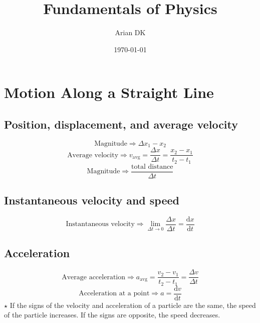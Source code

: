\documentclass[fleqn]{article}
\title{Fundamentals of Physics}
\author{Arian DK}
\date{\today}
\begin{document}
\setcounter{section}{1}

\maketitle

\section{Motion Along a Straight Line}

\subsection{Position, displacement, and average velocity}

\begin{equation*}
    \textrm{Magnitude} \Rightarrow \Delta x_1 - x_2
\end{equation*}
\begin{equation*}
    \textrm{Average velocity} \Rightarrow v_\textrm{avg} = \frac{\Delta x}{\Delta t} = \frac{x_2 - x_1}{t_2 - t_1}
\end{equation*}
\begin{equation*}
    \textrm{Magnitude} \Rightarrow \frac{\textrm{total distance}}{\Delta t}
\end{equation*}

\subsection{Instantaneous velocity and speed}

\begin{equation*}
    \textrm{Instantaneous velocity} \Rightarrow \lim_{\Delta t \to 0} \frac{\Delta x}{\Delta t} = \frac{\mathrm{d}x}{\mathrm{d}t}
\end{equation*}

\subsection{Acceleration}
\begin{equation*}
    \textrm{Average acceleration} \Rightarrow a_{\text{avg}} = \frac{v_2 - v_1}{t_2 - t_1} = \frac{\Delta v}{\Delta t}
\end{equation*}
\begin{equation*}
    \textrm{Acceleration at a point} \Rightarrow a = \frac{\mathrm{d}v}{\mathrm{d}t}
\end{equation*}
\noindent $\star$ If the signs of the velocity and acceleration of a particle are the same, the speed
of the particle increases. If the signs are opposite, the speed decreases.
\end{document}

